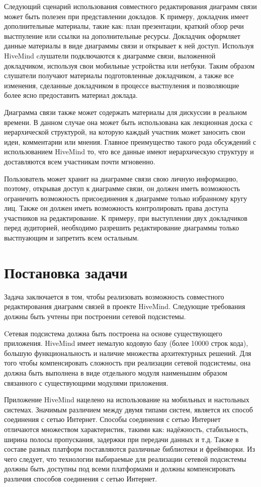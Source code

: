 Следующий сценарий использования совместного редактирования диаграмм связи может
быть полезен при представлении докладов. К примеру, докладчик имеет
дополнительные материалы, такие как: план презентации, краткий обзор речи
выстпуление или ссылки на дополнительные ресурсы. Докладчик оформляет данные
материалы в виде диаграммы связи и открывает к ней доступ. Используя HiveMind
cлушатели подключаются к диаграмме связи, выложенной докладчиком, используя свои
мобильные устройства или нетбуки. Таким образом слушатели получают материалы
подготовленные докладчиком, а также все изменения, сделанные докладчиком в
процессе выстпуления и позволяющие более ясно предоставить материал доклада.

Диаграмма связи также может содержать материалы для дискуссии в реальном
времени. В данном случае она может быть использована как лекционная доска с
иерархической структурой, на которую каждый участник может заносить свои идеи,
комментарии или мнения. Главное преимущество такого рода обсуждений с
использованием HiveMind то, что все данные имеют иерархическую структуру и
доставляются всем участникам почти мгновенно.

Пользователь может хранит на диаграмме связи свою личную информацию, поэтому,
открывая доступ к диаграмме связи, он должен иметь возможность ограничить
возможность присоединения к диаграмме только избранному кругу лиц. Также он
должен иметь возможность контролировать права доступа участников на
редактирование. К примеру, при выступлении двух докладчиков перед аудиторией,
необходимо разрешить редактирование диаграммы только выстпуающим и
запретить всем остальным.


\section{Постановка задачи}
\label{sec:problem_statement}
Задача заключается в том, чтобы реализовать возможность совместного
редактирования диаграмм связей в проекте HiveMind. Следующие требования должны
быть учтены при построении сетевой подсистемы.

Cетевая подсистема должна быть построена на основе существующего приложения.
HiveMind имеет немалую кодовую базу (более 10000 строк кода), большую
функциональность и наличие множества архитектурных решений. Для того чтобы
компенсировать сложность при реализации сетевой подсистемы, она должна быть
выполнена в виде отдельного модуля наименьшим образом связанного с существующими
модулями приложения.

Приложение HiveMind нацелено на использование на мобильных и настольных
системах. Значимым различием между двумя типами систем, является их способ
соединения с сетью Интернет. Способы соединения с сетью Интернет отличаются
множеством характеристик, такими как: надёжность, стабильность, ширина
полосы пропускания, задержки при передачи данных и т.д. Также в составе разных
платформ поставляются различные библиотеки и фреймворки. Из чего следует, что
технологии выбираемые для реализации сетевой подсистемы должны быть доступны под
всеми платформами и должны компенсировать различия способов соединения с сетью
Интернет.
